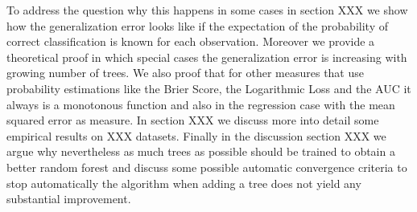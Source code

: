 \documentclass[paper=a4
               ,12pt
               ,DIV=12
               ,parskip=half
               ,titlepage=on
               ,headinclude 
               ,footinclude
               ,headsepline
               ,footsepline         %
               ,ilines 
               ]{scrartcl}
\begin{document}
To address the question why this happens in some cases in section XXX we show how the generalization error looks like if the expectation of the probability of correct classification is known for each observation. 
Moreover we provide a theoretical proof in which special cases the generalization error is increasing with growing number of trees. We also proof that for other measures that use probability estimations like 
the Brier Score, the Logarithmic Loss and the AUC it always is a monotonous function and also in the regression case with the mean squared error as measure. 
In section XXX we discuss more into detail some empirical results on XXX datasets. 
Finally in the discussion section XXX we argue why nevertheless as much trees as possible should be trained to obtain a better random forest and discuss some possible automatic convergence criteria to stop automatically the
algorithm when adding a tree does not yield any substantial improvement. 
\end{document}
